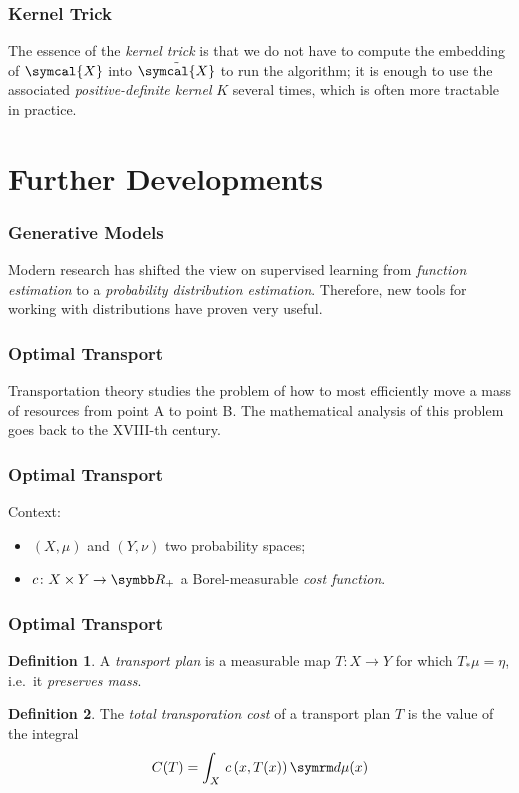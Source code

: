 \documentclass{beamer}
\theoremstyle{definition}
\newtheorem*{definition*}{Definition}
\begin{document}
\begin{frame}
\frametitle{Kernel Trick}

The essence of the \emph{kernel trick} is that we do not have to compute the embedding of \(\symcal{X}\) into \(\Tilde{\symcal{X}}\) to run the algorithm; it is enough to use the associated \emph{positive-definite kernel} \(K\) several times, which is often more tractable in practice.
\end{frame}

\section{Further Developments}

\begin{frame}
\frametitle{Generative Models}

Modern research has shifted the view on supervised learning from \emph{function estimation} to a \emph{probability distribution estimation}. Therefore, new tools for working with distributions have proven very useful.
\end{frame}

\begin{frame}
\frametitle{Optimal Transport}

Transportation theory studies the problem of how to most efficiently move a mass of resources from point A to point B. The mathematical analysis of this problem goes back to the XVIII-th century.
\end{frame}

\begin{frame}
\frametitle{Optimal Transport}

Context:
\begin{itemize}
    \item \(\left(X, \mu\right)\) and \(\left(Y, \nu\right)\) two probability spaces;
    \item \(c \colon X \times Y \to \reals_{+}\) a Borel-measurable \emph{cost function}.
\end{itemize}
\end{frame}

\begin{frame}
\frametitle{Optimal Transport}

\begin{definition*}
A \emph{transport plan} is a measurable map \(T \colon X \to Y\) for which \(T_{*} \mu = \eta\), i.e.\ it \emph{preserves mass}.
\end{definition*}

\begin{definition*}
The \emph{total transporation cost} of a transport plan \(T\) is the value of the integral
\[
    C(T) = \int_{X} \, c\left(x, T(x)\right) \diff \mu(x)
\]
\end{definition*}
\end{frame}
\end{document}
